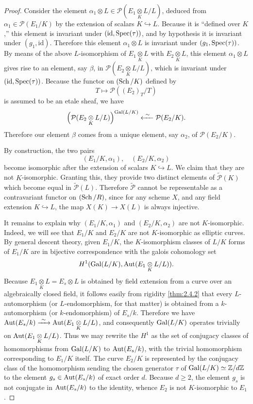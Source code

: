 \begin{proof}
Consider the element $\alpha_1 \otimes L \in \mathcal{P}(E_1 \underset{K}{\otimes} L/L)$, deduced from $\alpha_1 \in \mathcal{P}(E_1/K)$ by the extension of scalars $K \hookrightarrow L$. Because it is ``defined over $K$,'' this element is invariant under $(\mathrm{id}, \operatorname{Spec}(\tau))$, and by hypothesis it is invariant under $(g_1, \mathrm{id})$. Therefore this element $\alpha_1 \otimes L$ is invariant under $(g_1, \operatorname{Spec}(\tau))$. By means of the above $L$-isomorphism of $E_1 \underset{K}{\otimes} L$ with $E_2 \underset{K}{\otimes} L$, this element $\alpha_1 \otimes L$ gives rise to an element, say $\beta$, in $\mathcal{P}(E_2 \underset{K}{\otimes} L/L)$, which is invariant under $(\mathrm{id}, \operatorname{Spec}(\tau))$. Because the functor on $(\operatorname{Sch}/K)$ defined by
\[
T \longmapsto \mathcal{P}((E_2)_T/T)
\]
is assumed to be an etale sheaf, we have
\[
\Bigl(\mathcal{P}(E_2 \underset{K}{\otimes} L/L)\Bigr)^{\operatorname{Gal}(L/K)} \xleftarrow{\ \sim\ } \mathcal{P}(E_2/K).
\]
Therefore our element $\beta$ comes from a unique element, say $\alpha_2$, of $\mathcal{P}(E_2/K)$.

By construction, the two pairs
\[
(E_1/K, \alpha_1), \quad (E_2/K, \alpha_2)
\]
become isomorphic after the extension of scalars $K \hookrightarrow L$. We claim that they are not $K$-isomorphic. Granting this, they provide two distinct elements of $\widetilde{\mathcal{P}}(K)$ which become equal in $\widetilde{\mathcal{P}}(L)$. Therefore $\widetilde{\mathcal{P}}$ cannot be representable as a contravariant functor on $(\operatorname{Sch}/R)$, since for any scheme $X$, and any field extension $K \hookrightarrow L$, the map $X(K) \to X(L)$ is always injective.

It remains to explain why $(E_1/K, \alpha_1)$ and $(E_2/K, \alpha_2)$ are not $K$-isomorphic. Indeed, we will see that $E_1/K$ and $E_2/K$ are not $K$-isomorphic as elliptic curves. By general descent theory, given $E_1/K$, the $K$-isomorphism classes of $L/K$ forms of $E_1/K$ are in bijective correspondence with the galois cohomology set
\[
H^1(\operatorname{Gal}(L/K), \operatorname{Aut}(E_1 \underset{K}{\otimes} L/L)).
\]
Because $E_1 \underset{K}{\otimes} L = E_s \otimes L$ is obtained by field extension from a curve over an algebraically closed field, it follows easily from rigidity \ref{thm:2.4.2} that every $L$-automorphism (or $L$-endomorphism, for that matter) is obtained from a $k$-automorphism (or $k$-endomorphism) of $E_s/k$. Therefore we have $\Aut(E_s/k) \xrightarrow{\ \sim\ } \Aut(E_1 \underset{K}{\otimes} L/L)$, and consequently $\operatorname{Gal}(L/K)$ operates trivially on $\operatorname{Aut}(E_1 \underset{K}{\otimes} L/L)$. Thus we may rewrite the $H^1$ as the set of conjugacy classes of homomorphisms from $\operatorname{Gal}(L/K)$ to $\operatorname{Aut}(E_s/k)$, with the trivial homomorphism corresponding to $E_1/K$ itself. The curve $E_2/K$ is represented by the conjugacy class of the homomorphism sending the chosen generator $\tau$ of $\operatorname{Gal}(L/K) \simeq \mathbb{Z}/d\mathbb{Z}$ to the element $g_s \in \operatorname{Aut}(E_s/k)$ of exact order $d$. Because $d \ge 2$, the element $g_s$ is not conjugate in $\operatorname{Aut}(E_s/k)$ to the identity, whence $E_2$ is not $K$-isomorphic to $E_1$.
\end{proof}
